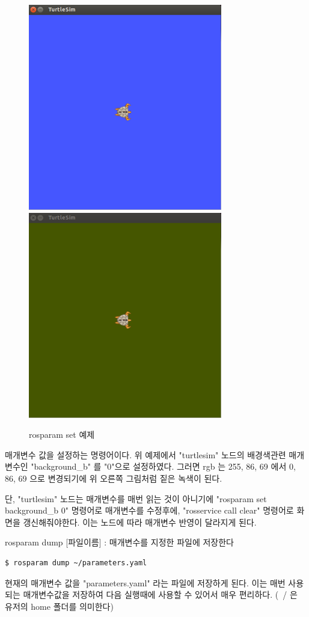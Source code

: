 \begin{figure}[h]
\centering\includegraphics[width=0.4\columnwidth]{pictures/chapter5/rosparam_set1.png}
\centering\includegraphics[width=0.4\columnwidth]{pictures/chapter5/rosparam_set2.png}
\caption{rosparam set 예제}
\end{figure}

\noindent
매개변수 값을 설정하는 명령어이다. 위 예제에서 "turtlesim" 노드의 배경색관련 매개변수인 "background\_b" 를 "0"으로 설정하였다. 그러면 rgb 는 255, 86, 69 에서 0, 86, 69 으로 변경되기에 위 오른쪽 그림처럼 짙은 녹색이 된다.

단, "turtlesim" 노드는 매개변수를 매번 읽는 것이 아니기에 "rosparam set background\_b 0" 명령어로 매개변수를 수정후에, "rosservice call clear" 명령어로 화면을 갱신해줘야한다. 이는 노드에 따라 매개변수 반영이 달라지게 된다.

\vspace{\baselineskip}
\noindent
{}\circled{\thenum} rosparam dump [파일이름] : 매개변수를 지정한 파일에 저장한다

\begin{lstlisting}[language=ROS]
$ rosparam dump ~/parameters.yaml
\end{lstlisting}

\noindent
현재의 매개변수 값을 "parameters.yaml" 라는 파일에 저장하게 된다. 이는 매번 사용되는 매개변수값을 저장하여 다음 실행때에 사용할 수 있어서 매우 편리하다. (~/ 은 유저의 home 폴더를 의미한다)

